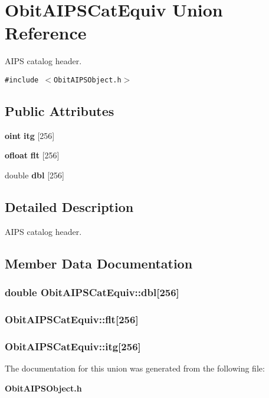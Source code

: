 \section{Obit\-AIPSCat\-Equiv Union Reference}
\label{unionObitAIPSCatEquiv}
AIPS catalog header.  


{\tt \#include $<$Obit\-AIPSObject.h$>$}

\subsection*{Public Attributes}
\begin{CompactItemize}
\item 
{\bf oint} {\bf itg} [256]
\item 
{\bf ofloat} {\bf flt} [256]
\item 
double {\bf dbl} [256]
\end{CompactItemize}


\subsection{Detailed Description}
AIPS catalog header. 



\subsection{Member Data Documentation}
\subsubsection{\setlength{\rightskip}{0pt plus 5cm}double {\bf Obit\-AIPSCat\-Equiv::dbl}[256]}\label{unionObitAIPSCatEquiv_o2}


\subsubsection{ {\bf Obit\-AIPSCat\-Equiv::flt}[256]}\label{unionObitAIPSCatEquiv_o1}


\subsubsection{ {\bf Obit\-AIPSCat\-Equiv::itg}[256]}\label{unionObitAIPSCatEquiv_o0}




The documentation for this union was generated from the following file:\begin{CompactItemize}
\item 
{\bf Obit\-AIPSObject.h}\end{CompactItemize}
